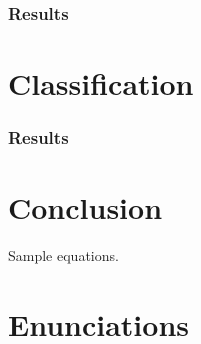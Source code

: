 \documentclass{IET}%
\newtheorem{theorem}{Theorem}
\newtheorem{condition}{Condition}
\begin{document}
\subsubsection{Results}

\section{Classification}

\subsubsection{Results}

\section{Conclusion}
Sample equations.

\section{Enunciations}




\end{document}
